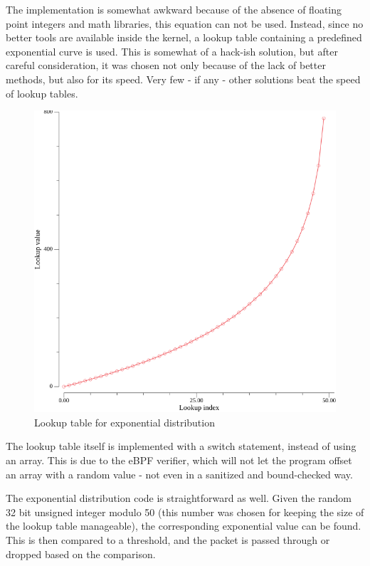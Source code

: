 \newpage
The implementation is somewhat awkward because of the absence of floating point integers and math libraries, this equation can not be used. Instead, since no better tools are available inside the kernel, a lookup table containing a predefined exponential curve is used. This is somewhat of a hack-ish solution, but after careful consideration, it was chosen not only because of the lack of better methods, but also for its speed. Very few - if any - other solutions beat the speed of lookup tables.

\begin{figure}[H]
	\centering
	\includegraphics[width=\textwidth]{images/lookuptable.png}
	\caption{Lookup table for exponential distribution}
	\label{fig:exp-lookup-table}
\end{figure}

The lookup table itself is implemented with a switch statement, instead of using an array. This is due to the eBPF verifier, which will not let the program offset an array with a random value - not even in a sanitized and bound-checked way.

The exponential distribution code is straightforward as well. Given the random 32 bit unsigned integer modulo 50 (this number was chosen for keeping the size of the lookup table manageable), the corresponding exponential value can be found. This is then compared to a threshold, and the packet is passed through or dropped based on the comparison.


